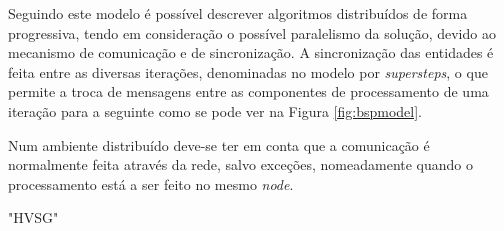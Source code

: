 Seguindo este modelo é possível descrever algoritmos distribuídos de forma 
progressiva, tendo em consideração o possível paralelismo da solução, devido ao 
mecanismo de comunicação e de sincronização. A sincronização das entidades é  
feita entre as diversas iterações, denominadas no modelo por 
\textit{supersteps}, o que permite a troca de mensagens entre as componentes de 
processamento de uma iteração para a seguinte como se pode ver na Figura 
\ref{fig:bspmodel}.

Num ambiente distribuído deve-se ter em conta que a comunicação é normalmente 
feita através da rede, salvo exceções, nomeadamente quando o processamento 
está a ser feito no mesmo \textit{node}.

{"HVSG"}